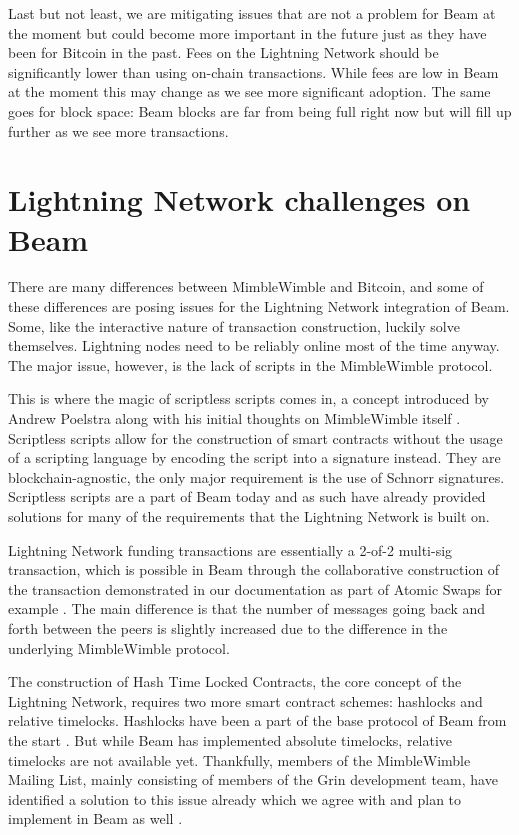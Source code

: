\documentclass[letterpaper]{article}
\begin{document}
Last but not least, we are mitigating issues that are not a problem for Beam at the moment but could become more important in the future just as they have been for Bitcoin in the past. Fees on the Lightning Network should be significantly lower than using on-chain transactions. While fees are low in Beam at the moment this may change as we see more significant adoption. The same goes for block space: Beam blocks are far from being full right now but will fill up further as we see more transactions.

\section{Lightning Network challenges on Beam}
There are many differences between MimbleWimble and Bitcoin, and some of these differences are posing issues for the Lightning Network integration of Beam. Some, like the interactive nature of transaction construction, luckily solve themselves. Lightning nodes need to be reliably online most of the time anyway. The major issue, however, is the lack of scripts in the MimbleWimble protocol. 

This is where the magic of scriptless scripts comes in, a concept introduced by Andrew Poelstra along with his initial thoughts on MimbleWimble itself \cite{poelstra}. Scriptless scripts allow for the construction of smart contracts without the usage of a scripting language by encoding the script into a signature instead. They are blockchain-agnostic, the only major requirement is the use of Schnorr signatures. Scriptless scripts are a part of Beam today and as such have already provided solutions for many of the requirements that the Lightning Network is built on.

Lightning Network funding transactions are essentially a 2-of-2 multi-sig transaction, which is possible in Beam through the collaborative construction of the transaction demonstrated in our documentation as part of Atomic Swaps for example \cite{swap}. The main difference is that the number of messages going back and forth between the peers is slightly increased due to the difference in the underlying MimbleWimble protocol.

The construction of Hash Time Locked Contracts, the core concept of the Lightning Network, requires two more smart contract schemes: hashlocks and relative timelocks. Hashlocks have been a part of the base protocol of Beam from the start \cite{transaction}. But while Beam has implemented absolute timelocks, relative timelocks are not available yet. Thankfully, members of the MimbleWimble Mailing List, mainly consisting of members of the Grin development team, have identified a solution to this issue already which we agree with and plan to implement in Beam as well \cite{contracts}.
\end{document}
